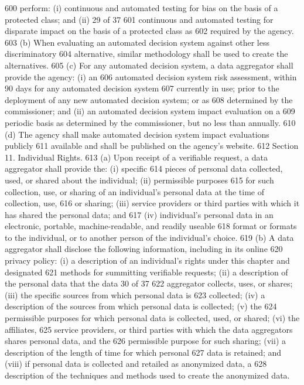 600 perform: (i) continuous and automated testing for bias on the basis of a protected class; and (ii)
29 of 37
601 continuous and automated testing for disparate impact on the basis of a protected class as
602 required by the agency.
603 (b) When evaluating an automated decision system against other less discriminatory
604 alternative, similar methodology shall be used to create the alternatives.
605 (c) For any automated decision system, a data aggregator shall provide the agency: (i) an
606 automated decision system risk assessment, within 90 days for any automated decision system
607 currently in use; prior to the deployment of any new automated decision system; or as
608 determined by the commissioner; and (ii) an automated decision system impact evaluation on a
609 periodic basis as determined by the commissioner, but no less than annually.
610 (d) The agency shall make automated decision system impact evaluations publicly
611 available and shall be published on the agency’s website.
612 Section 11. Individual Rights.
613 (a) Upon receipt of a verifiable request, a data aggregator shall provide the: (i) specific
614 pieces of personal data collected, used, or shared about the individual; (ii) permissible purposes
615 for such collection, use, or sharing of an individual’s personal data at the time of collection, use,
616 or sharing; (iii) service providers or third parties with which it has shared the personal data; and
617 (iv) individual’s personal data in an electronic, portable, machine-readable, and readily useable
618 format or formats to the individual, or to another person of the individual’s choice.
619 (b) A data aggregator shall disclose the following information, including in its online
620 privacy policy: (i) a description of an individual’s rights under this chapter and designated
621 methods for summitting verifiable requests; (ii) a description of the personal data that the data
30 of 37
622 aggregator collects, uses, or shares; (iii) the specific sources from which personal data is
623 collected; (iv) a description of the sources from which personal data is collected; (v) the
624 permissible purposes for which personal data is collected, used, or shared; (vi) the affiliates,
625 service providers, or third parties with which the data aggregators shares personal data, and the
626 permissible purpose for such sharing; (vii) a description of the length of time for which personal
627 data is retained; and (viii) if personal data is collected and retailed as anonymized data, a
628 description of the techniques and methods used to create the anonymized data.
